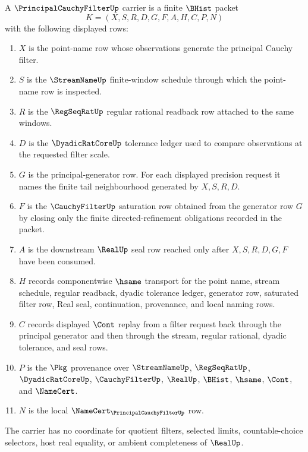 \begin{definition}
\label{def:principal-cauchy-filter-carrier}
A $\PrincipalCauchyFilterUp$ carrier is a finite $\BHist$ packet
$$
K=(X,S,R,D,G,F,A,H,C,P,N)
$$
with the following displayed rows:
\begin{enumerate}
\item $X$ is the point-name row whose observations generate the principal Cauchy filter.
\item $S$ is the $\StreamNameUp$ finite-window schedule through which the point-name row is inspected.
\item $R$ is the $\RegSeqRatUp$ regular rational readback row attached to the same windows.
\item $D$ is the $\DyadicRatCoreUp$ tolerance ledger used to compare observations at the requested filter scale.
\item $G$ is the principal-generator row. For each displayed precision request it names the finite tail neighbourhood generated by $X,S,R,D$.
\item $F$ is the $\CauchyFilterUp$ saturation row obtained from the generator row $G$ by closing only the finite directed-refinement obligations recorded in the packet.
\item $A$ is the downstream $\RealUp$ seal row reached only after $X,S,R,D,G,F$ have been consumed.
\item $H$ records componentwise $\hsame$ transport for the point name, stream schedule, regular readback, dyadic tolerance ledger, generator row, saturated filter row, Real seal, continuation, provenance, and local naming rows.
\item $C$ records displayed $\Cont$ replay from a filter request back through the principal generator and then through the stream, regular rational, dyadic tolerance, and seal rows.
\item $P$ is the $\Pkg$ provenance over $\StreamNameUp$, $\RegSeqRatUp$, $\DyadicRatCoreUp$, $\CauchyFilterUp$, $\RealUp$, $\BHist$, $\hsame$, $\Cont$, and $\NameCert$.
\item $N$ is the local $\NameCert_{\PrincipalCauchyFilterUp}$ row.
\end{enumerate}
The carrier has no coordinate for quotient filters, selected limits, countable-choice selectors, host real equality, or ambient completeness of $\RealUp$.
\end{definition}

